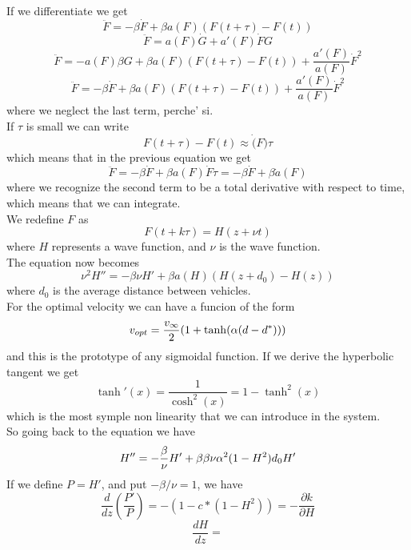 If we differentiate we get
$$
	\ddot{F} = -\beta\dot{F} + \beta a(F)(F(t+\tau) - F(t))
$$
$$
	\ddot{F} = a(F)\dot{G} + a'(F)\dot{F}G
$$
$$
	\ddot{F} = -a(F)\beta G + \beta a(F)(F(t+\tau) - F(t)) + \frac{a'(F)}{a(F)}\dot{F}^2
$$
$$
	\ddot{F} = -\beta \dot{F} + \beta a(F)(F(t+\tau) - F(t)) + \frac{a'(F)}{a(F)}\dot{F}^2 
$$
where we neglect the last term, perche' si. \\
If $\tau$ is small we can write
$$
	F(t+\tau) - F(t) \approx \dot(F)\tau
$$
which means that in the previous equation we get
$$
	\ddot{F} = -\beta \dot{F} + \beta a(F)\dot{F}\tau = -\beta \dot{F} + \beta \dot{a}(F)
$$
where we recognize the second term to be a total derivative with respect to time, which means that we can integrate. \\
We redefine $F$ as
$$
	F(t + k\tau) = H(z + \nu t) 
$$
where $H$ represents a wave function, and $\nu$ is the wave function. \\
The equation now becomes
$$
	\nu^2 H'' = -\beta \nu H' + \beta a(H)(H(z + d_0) - H(z))
$$
where $d_0$ is the average distance between vehicles. \\
For the optimal velocity we can have a funcion of the form
$$
	v_{opt} = \frac{v_\infty}{2}(1 + \tanh(\alpha(d-d^*)))
$$
and this is the prototype of any sigmoidal function. If we derive the hyperbolic tangent we get
$$
	\tanh'(x) = \frac{1}{\cosh^2(x)} = 1 - \tanh^2(x)
$$
which is the most symple non linearity that we can introduce in the system. \\
So going back to the equation we have
$$
	H'' = -\frac{\beta}{\nu}H' + \beta{\beta}{\nu}\alpha^2(1-H^2)d_0H'
$$
If we define $P=H'$, and put $-\beta/\nu = 1$, we have
$$
	\frac{d}{dz}(\frac{P'}{P}) = -(1-c*(1-H^2)) = -\frac{\partial k}{\partial H}
$$
$$
	\frac{dH}{dz} = 
$$

